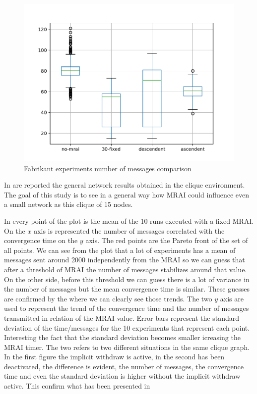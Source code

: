 \documentclass[10pt,conference,letterpaper]{IEEEtran}
\newcommand{\figwidth}{0.78}
\newcommand{\figvspace}{-1.5em}
\begin{document}
\begin{figure}[tb]
	\centering
	\includegraphics[width=\figwidth\columnwidth]{images/fabrikant/messages_comparison}
	\caption{Fabrikant experiments number of messages comparison}
	\label{fig:fabr_msg_comp}
	\vspace{\figvspace}
\end{figure}

In  are reported the general
network results obtained in the clique environment.
The goal of this study is to see in a general way how \ac{MRAI} could influence
even a small network as this clique of \num{15} nodes.

In  every point of the plot is the mean of the \num{10}
runs executed with a fixed \ac{MRAI}.
On the $x$ axis is represented the number of messages correlated with the convergence
time on the $y$ axis.
The red points are the Pareto front of the set of all points.
We can see from the plot that a lot of experiments has a mean of messages sent 
around \num{2000} independently from the \ac{MRAI} so we can guess that after
a threshold of \ac{MRAI} the number of messages stabilizes around that value.
On the other side, before this threshold we can guess there is a lot of variance
in the number of messages but the mean convergence time is similar.
These guesses are confirmed by the  where we can clearly
see those trends.
The two $y$ axis are used to represent the trend of the convergence time and
the number of messages transmitted in relation of the \ac{MRAI} value.
Error bars represent the standard deviation of the time/messages for the \num{10}
experiments that represent each point.
Interesting the fact that the standard deviation becomes smaller icreasing the
\ac{MRAI} timer.
The two  refers
to two different situations in the same clique graph.
In the first figure the implicit withdraw is active, in the second has been
deactivated, the difference is evident, the number of messages, the convergence
time and even the standard deviation is higher without the implicit withdraw
active. This confirm what has been presented in \cite{labovitz2000delayed} 
\end{document}
